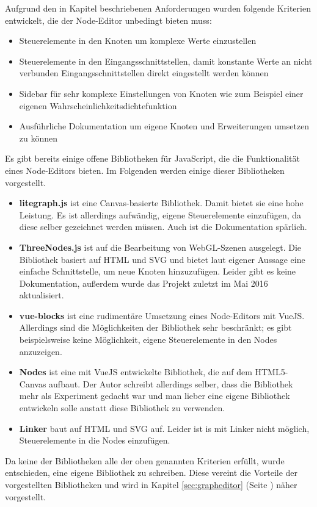 Aufgrund den in Kapitel  beschriebenen Anforderungen wurden folgende Kriterien entwickelt, die der Node-Editor unbedingt bieten muss:
\begin{itemize}
    \item Steuerelemente in den Knoten um komplexe Werte einzustellen
    \item Steuerelemente in den Eingangsschnittstellen, damit konstante Werte an nicht verbunden Eingangsschnittstellen direkt eingestellt werden können
    \item Sidebar für sehr komplexe Einstellungen von Knoten wie zum Beispiel einer eigenen Wahrscheinlichkeitsdichtefunktion
    \item Ausführliche Dokumentation um eigene Knoten und Erweiterungen umsetzen zu können
\end{itemize}

Es gibt bereits einige offene Bibliotheken für JavaScript, die die Funktionalität eines Node-Editors bieten. Im Folgenden werden einige dieser Bibliotheken vorgestellt.

\begin{itemize}
    \item \textbf{litegraph.js} ist eine Canvas-basierte Bibliothek. Damit bietet sie eine hohe Leistung. Es ist allerdings aufwändig, eigene Steuerelemente einzufügen, da diese selber gezeichnet werden müssen. Auch ist die Dokumentation spärlich. \cite{litegraph}
    \item \textbf{ThreeNodes.js} ist auf die Bearbeitung von WebGL-Szenen ausgelegt. Die Bibliothek basiert auf HTML und SVG und bietet laut eigener Aussage eine einfache Schnittstelle, um neue Knoten hinzuzufügen. Leider gibt es keine Dokumentation, außerdem wurde das Projekt zuletzt im Mai 2016 aktualisiert. \cite{threenodes}
    \item \textbf{vue-blocks} ist eine rudimentäre Umsetzung eines Node-Editors mit VueJS. Allerdings sind die Möglichkeiten der Bibliothek sehr beschränkt; es gibt beispielsweise keine Möglichkeit, eigene Steuerelemente in den Nodes anzuzeigen. \cite{vueblocks}
    \item \textbf{Nodes} ist eine mit VueJS entwickelte Bibliothek, die auf dem HTML5-Canvas aufbaut. Der Autor schreibt allerdings selber, dass die Bibliothek mehr als Experiment gedacht war und man lieber eine eigene Bibliothek entwickeln solle anstatt diese Bibliothek zu verwenden. \cite{nodes}
    \item \textbf{Linker} baut auf HTML und SVG auf. Leider ist is mit Linker nicht möglich, Steuerelemente in die Nodes einzufügen. \cite{linker}
\end{itemize}

Da keine der Bibliotheken alle der oben genannten Kriterien erfüllt, wurde entschieden, eine eigene Bibliothek zu schreiben. Diese vereint die Vorteile der vorgestellten Bibliotheken und wird in Kapitel \ref{sec:grapheditor} (Seite \pageref{sec:grapheditor}) näher vorgestellt.